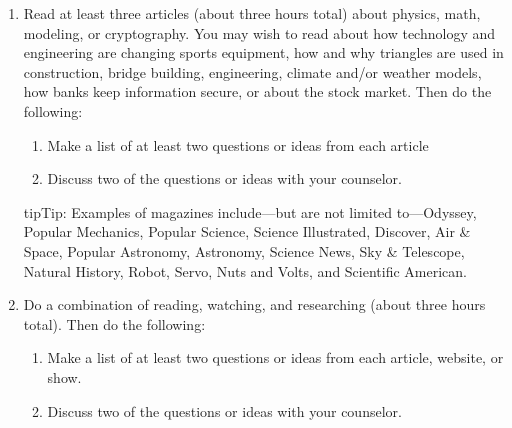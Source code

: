 \documentclass[letterpaper,10pt,english]{sphinxmanual}
\begin{document}
\begin{enumerate}
\begin{enumerate}
\end{enumerate}

\begin{sphinxadmonition}{tip}{Tip:}
“The Mathematics of Cryptology”: University of Massachusetts Website: 
\end{sphinxadmonition}

\item {} 
Read at least three articles (about three hours total) about physics, math, modeling, or cryptography. You may wish to read about how technology and engineering are changing sports equipment, how and why triangles are used in construction, bridge building, engineering, climate and/or weather models, how banks keep information secure, or about the stock market. Then do the following:
\begin{enumerate}
%
\item {} 
Make a list of at least two questions or ideas from each article

\item {} 
Discuss two of the questions or ideas with your counselor.

\end{enumerate}

\begin{sphinxadmonition}{tip}{Tip:}
Examples of magazines include—but are not limited to—Odyssey, Popular Mechanics, Popular Science, Science Illustrated, Discover, Air \& Space, Popular Astronomy, Astronomy, Science News, Sky \& Telescope, Natural History, Robot, Servo, Nuts and Volts, and Scientific American.
\end{sphinxadmonition}

\item {} 
Do a combination of reading, watching, and researching (about three hours total). Then do the following:
\begin{enumerate}
%
\item {} 
Make a list of at least two questions or ideas from each article, website, or show.

\item {} 
Discuss two of the questions or ideas with your counselor.

\end{enumerate}

\end{enumerate}
\end{document}
